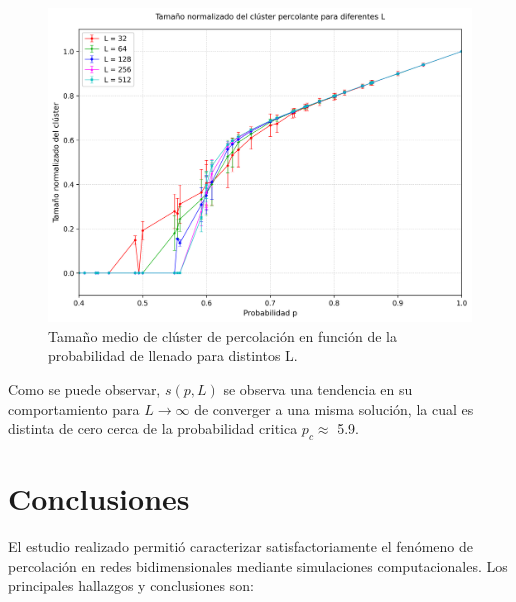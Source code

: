 \documentclass[12pt,a4paper]{article}
\begin{document}
\begin{figure}[H]
   \centering
   \includegraphics[width=0.75\linewidth]{../figures/Cluster_all_L.png}
    \caption{Tamaño medio de clúster de percolación en función de la probabilidad de llenado para distintos L.}
    \label{fig:6}
\end{figure}

Como se puede observar, $s(p,L)$ se observa una tendencia en su comportamiento para $L\rightarrow\infty$ de converger a una misma solución, la cual es distinta de cero cerca de la probabilidad critica $p_c\approx$ 5.9. 

\section{Conclusiones}

El estudio realizado permitió caracterizar satisfactoriamente el fenómeno de percolación en redes bidimensionales mediante simulaciones computacionales. Los principales hallazgos y conclusiones son:
\end{document}
